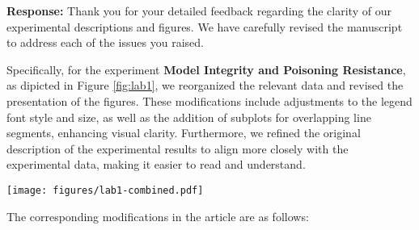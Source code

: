 \documentclass[a4paper,twoside,11pt,dvipsnames]{reviewresponse}
\begin{document}
\textbf{Response:} 
Thank you for your detailed feedback regarding the clarity of our experimental descriptions and figures. We have carefully revised the manuscript to address each of the issues you raised. 

Specifically, for the experiment \textbf{Model Integrity and Poisoning Resistance}, as dipicted in Figure \ref{fig:lab1}, we reorganized the relevant data and revised the presentation of the figures. These modifications include adjustments to the legend font style and size, as well as the addition of subplots for overlapping line segments, enhancing visual clarity. Furthermore, we refined the original description of the experimental results to align more closely with the experimental data, making it easier to read and understand.

\begin{figure*}[!ht]
    \centering
    \texttt{[image: figures/lab1-combined.pdf]}
    \caption{ASR and TSR of various defense mechanisms (FedAVG, FLTrust, Foolsgold, Flame, SecFFT) under three attacks (MR, NEUR, EDGE CASE).}
    \label{fig:lab1}
\end{figure*}

The corresponding modifications in the article are as follows:
\end{document}
